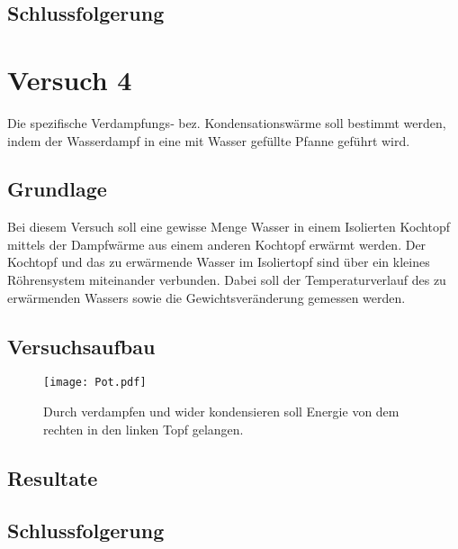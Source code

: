 \documentclass{article}
\begin{document}
\subsection{Schlussfolgerung}
\section{Versuch 4}
Die spezifische Verdampfungs‐ bez. Kondensationswärme soll bestimmt werden, indem der Wasserdampf in eine
mit Wasser gefüllte Pfanne geführt wird.
\subsection{Grundlage}
Bei diesem Versuch soll eine gewisse Menge Wasser in einem Isolierten Kochtopf mittels der 
Dampfwärme aus einem anderen Kochtopf erwärmt werden. Der Kochtopf und das zu erwärmende 
Wasser im Isoliertopf sind über ein kleines Röhrensystem miteinander verbunden. Dabei soll der 
Temperaturverlauf des zu erwärmenden Wassers sowie die Gewichtsveränderung gemessen werden. 
\subsection{Versuchsaufbau}
\begin{figure}[H]
\texttt{[image: Pot.pdf]} 
\caption{Durch verdampfen und wider kondensieren soll Energie von dem rechten in den linken Topf gelangen.}
\end{figure}
\subsection{Resultate}

\subsection{Schlussfolgerung}
\end{document}

